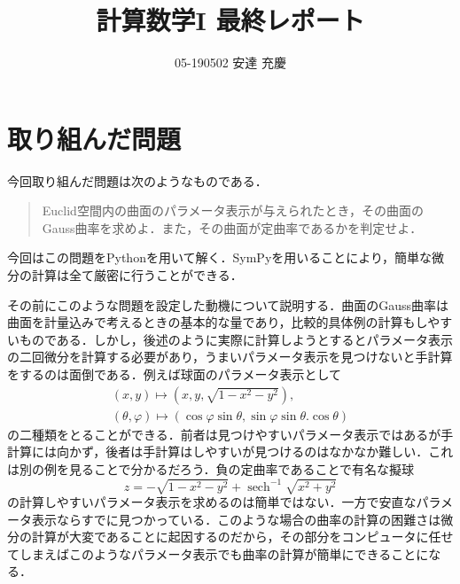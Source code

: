 \documentclass{jsarticle}
\title{計算数学I 最終レポート}
\author{05-190502 安達 充慶}
\date{}
\theoremstyle{definition}
\newcommand{\sech}{\operatorname{sech}}
\begin{document}
\maketitle
\section{取り組んだ問題}
今回取り組んだ問題は次のようなものである．
\begin{quote}
Euclid空間内の曲面のパラメータ表示が与えられたとき，その曲面のGauss曲率を求めよ．また，その曲面が定曲率であるかを判定せよ．
\end{quote}
今回はこの問題をPythonを用いて解く．SymPyを用いることにより，簡単な微分の計算は全て厳密に行うことができる．

その前にこのような問題を設定した動機について説明する．曲面のGauss曲率は曲面を計量込みで考えるときの基本的な量であり，比較的具体例の計算もしやすいものである．しかし，後述のように実際に計算しようとするとパラメータ表示の二回微分を計算する必要があり，うまいパラメータ表示を見つけないと手計算をするのは面倒である．例えば球面のパラメータ表示として
\begin{align*}
  (x,y)\mapsto (x,y,\sqrt{1-x^2-y^2}), \\
  (\theta, \varphi) \mapsto (\cos\varphi \sin \theta, \sin \varphi \sin \theta. \cos \theta)
\end{align*}
の二種類をとることができる．前者は見つけやすいパラメータ表示ではあるが手計算には向かず，後者は手計算はしやすいが見つけるのはなかなか難しい．これは別の例を見ることで分かるだろう．負の定曲率であることで有名な擬球
\[ z = -\sqrt{1-x^2-y^2}+\sech^{-1}\sqrt{x^2+y^2} \]
の計算しやすいパラメータ表示を求めるのは簡単ではない．一方で安直なパラメータ表示ならすでに見つかっている．このような場合の曲率の計算の困難さは微分の計算が大変であることに起因するのだから，その部分をコンピュータに任せてしまえばこのようなパラメータ表示でも曲率の計算が簡単にできることになる．
\end{document}
